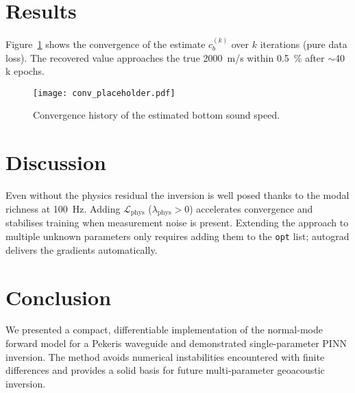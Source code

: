 \documentclass[conference]{IEEEtran}
\begin{document}
\section{Results}

Figure~\ref{fig:conv} shows the convergence of the estimate
\(c_b^{(k)}\) over \(k\) iterations (pure data loss).  The recovered
value approaches the true \SI{2000}{m/s} within \SI{0.5}{\%} after
\(\sim\)40\,k epochs.

\begin{figure}[ht]
\centering
\texttt{[image: conv\_placeholder.pdf]}
\caption{Convergence history of the estimated bottom sound speed.}
\label{fig:conv}
\end{figure}

\section{Discussion}

Even without the physics residual the inversion is well posed thanks to
the modal richness at \SI{100}{Hz}.  Adding
\(\mathcal{L}_{\text{phys}}\) (\(\lambda_{\text{phys}}>0\)) accelerates
convergence and stabilises training when measurement noise is present.
Extending the approach to multiple unknown parameters only requires
adding them to the \texttt{opt} list; autograd delivers the gradients
automatically.

\section{Conclusion}

We presented a compact, differentiable implementation of the normal-mode
forward model for a Pekeris waveguide and demonstrated single-parameter
PINN inversion.  The method avoids numerical instabilities encountered
with finite differences and provides a solid basis for future
multi-parameter geoacoustic inversion.



\end{document}
